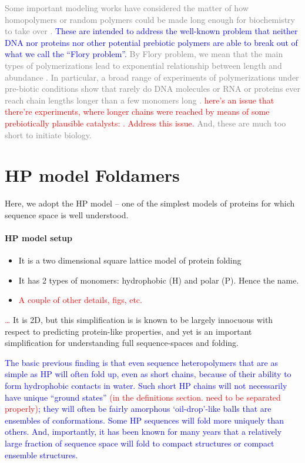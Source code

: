 \documentclass[12pt]{paper}
\newcommand{\red}[1]{\textcolor{red}{#1}}
\newcommand{\blue}[1]{\textcolor{blue}{#1}}
\newcommand{\gray}[1]{\textcolor{gray}{#1}}
\begin{document}
\gray{
Some important modeling works have considered the matter of how homopolymers or random 
polymers could be made long enough for biochemistry to take over \cite{}.  
\blue{These are intended to address the well-known problem that neither DNA \cite{} nor proteins 
  \cite{} nor other potential prebiotic polymers \cite{} are able to break out of what we call the 
  ``Flory problem''. }
By Flory problem, we mean that the main types of polymerizations lead to exponential relationship
between length and abundance \cite{Flory1953,??}.  In particular, a broad range of experiments 
of  polymerizations under pre-biotic conditions show that rarely do DNA molecules or RNA 
or proteins ever reach chain lengths longer than a few monomers long \cite{}. 
 \red{here's an issue that there're experiments, where longer chains were reached by means
   of some prebiotically plausible catalysts: \cite{}. Address this issue.}
And, these are much too short to initiate biology. 
}





 





\section{HP model Foldamers}
Here, we adopt the HP model -- one of the simplest models of proteins for which sequence 
space is well understood.   
\paragraph{HP model setup} 
\begin{itemize}
 \item It is a two dimensional square lattice model of protein folding
 \item It has 2 types of monomers: hydrophobic (H) and polar (P). Hence the name.
 \item \red{A couple of other details, figs, etc.}
\end{itemize}
\red{\dots}  It is 2D, but this simplification is  is known to be largely innocuous 
with respect to predicting protein-like properties, and yet is an important simplification for 
understanding full sequence-spaces and folding.   

\blue{The basic previous finding is that even sequence heteropolymers that are as simple as HP 
will often fold up, even as short chains, because of their ability to form hydrophobic contacts in 
water.  Such short HP chains will not necessarily have unique ``ground states'' \red{(in the 
definitions section. need to be separated properly)}; they will often be fairly amorphous 
`oil-drop’-like balls that are ensembles of conformations.  Some HP sequences will fold more 
uniquely than others.  And, importantly, it has been known for many years \cite{lau1989lattice} 
that a relatively large fraction of sequence space will fold to compact structures or compact 
ensemble structures.}
\end{document}
